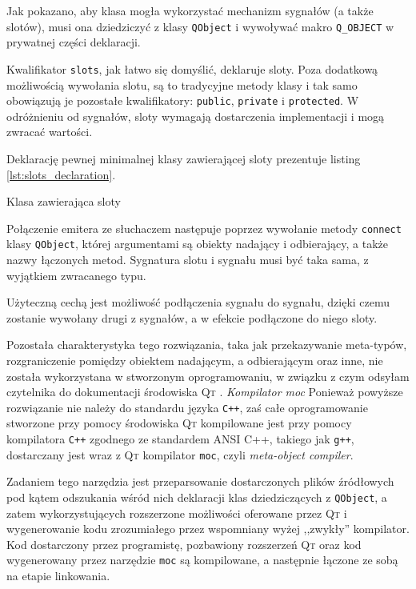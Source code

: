 Jak pokazano, aby klasa mogła wykorzystać mechanizm sygnałów (a także slotów), musi ona dziedziczyć z klasy \verb|QObject| i wywoływać makro \verb|Q_OBJECT| w prywatnej części deklaracji.

Kwalifikator \verb|slots|, jak łatwo się domyślić, deklaruje sloty. Poza dodatkową możliwością wywołania slotu, są to tradycyjne metody klasy i tak samo obowiązują je pozostałe kwalifikatory: \verb|public|, \verb|private| i \verb|protected|. W odróżnieniu od sygnałów, sloty wymagają dostarczenia implementacji i mogą zwracać wartości.

Deklarację pewnej minimalnej klasy zawierającej sloty prezentuje listing \ref{lst:slots_declaration}.

\begin{listing}
  
  \caption{Klasa zawierająca sloty}
  \label{lst:slots_declaration}
\end{listing}

Połączenie emitera ze słuchaczem następuje poprzez wywołanie metody \verb|connect| klasy \verb|QObject|, której argumentami są obiekty nadający i odbierający, a także nazwy łączonych metod. Sygnatura slotu i sygnału musi być taka sama, z wyjątkiem zwracanego typu.

Użyteczną cechą jest możliwość podłączenia sygnału do sygnału, dzięki czemu zostanie wywołany drugi z sygnałów, a w efekcie podłączone do niego sloty.

Pozostała charakterystyka tego rozwiązania, taka jak przekazywanie meta-typów, rozgraniczenie pomiędzy obiektem nadającym, a odbierającym oraz inne, nie została wykorzystana w stworzonym oprogramowaniu, w związku z czym odsyłam czytelnika do dokumentacji środowiska \textsc{Qt} \citep{Qt}.
\newline
\newline
\textsl{Kompilator moc} Ponieważ powyższe rozwiązanie nie należy do standardu języka \verb|C++|, zaś całe oprogramowanie stworzone przy pomocy środowiska \textsc{Qt} kompilowane jest przy pomocy kompilatora \verb|C++| zgodnego ze standardem ANSI C++, takiego jak \texttt{g++}, dostarczany jest wraz z \textsc{Qt} kompilator \texttt{moc}, czyli \textsl{meta-object compiler}.

Zadaniem tego narzędzia jest przeparsowanie dostarczonych plików źródłowych pod kątem odszukania wśród nich deklaracji klas dziedziczących z \verb|QObject|, a zatem wykorzystujących rozszerzone możliwości oferowane przez \textsc{Qt} i wygenerowanie kodu zrozumiałego przez wspomniany wyżej ,,zwykły'' kompilator. Kod dostarczony przez programistę, pozbawiony rozszerzeń \textsc{Qt} oraz kod wygenerowany przez narzędzie \texttt{moc} są kompilowane, a następnie łączone ze sobą na etapie linkowania.

